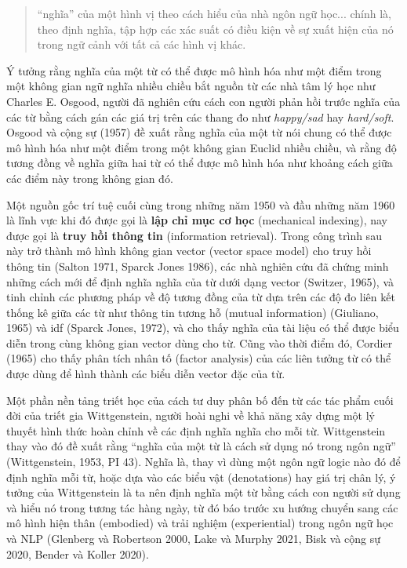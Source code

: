 \begin{quote}
``nghĩa'' của một hình vị theo cách hiểu của nhà ngôn ngữ học... chính là, theo định nghĩa, tập hợp các xác suất có điều kiện về sự xuất hiện của nó trong ngữ cảnh với tất cả các hình vị khác.
\end{quote}

Ý tưởng rằng nghĩa của một từ có thể được mô hình hóa như một điểm trong một không gian ngữ nghĩa nhiều chiều bắt nguồn từ các nhà tâm lý học như Charles E. Osgood, người đã nghiên cứu cách con người phản hồi trước nghĩa của các từ bằng cách gán các giá trị trên các thang đo như \emph{happy/sad} hay \emph{hard/soft}. Osgood và cộng sự (1957) đề xuất rằng nghĩa của một từ nói chung có thể được mô hình hóa như một điểm trong một không gian Euclid nhiều chiều, và rằng độ tương đồng về nghĩa giữa hai từ có thể được mô hình hóa như khoảng cách giữa các điểm này trong không gian đó.

Một nguồn gốc trí tuệ cuối cùng trong những năm 1950 và đầu những năm 1960 là lĩnh vực khi đó được gọi là \textbf{lập chỉ mục cơ học} (mechanical indexing), nay được gọi là \textbf{truy hồi thông tin} (information retrieval). Trong công trình sau này trở thành mô hình không gian vector (vector space model) cho truy hồi thông tin (Salton 1971, Sparck Jones 1986), các nhà nghiên cứu đã chứng minh những cách mới để định nghĩa nghĩa của từ dưới dạng vector (Switzer, 1965), và tinh chỉnh các phương pháp về độ tương đồng của từ dựa trên các độ đo liên kết thống kê giữa các từ như thông tin tương hỗ (mutual information) (Giuliano, 1965) và idf (Sparck Jones, 1972), và cho thấy nghĩa của tài liệu có thể được biểu diễn trong cùng không gian vector dùng cho từ. Cũng vào thời điểm đó, Cordier (1965) cho thấy phân tích nhân tố (factor analysis) của các liên tưởng từ có thể được dùng để hình thành các biểu diễn vector đặc của từ.

Một phần nền tảng triết học của cách tư duy phân bố đến từ các tác phẩm cuối đời của triết gia Wittgenstein, người hoài nghi về khả năng xây dựng một lý thuyết hình thức hoàn chỉnh về các định nghĩa nghĩa cho mỗi từ. Wittgenstein thay vào đó đề xuất rằng ``nghĩa của một từ là cách sử dụng nó trong ngôn ngữ'' (Wittgenstein, 1953, PI 43). Nghĩa là, thay vì dùng một ngôn ngữ logic nào đó để định nghĩa mỗi từ, hoặc dựa vào các biểu vật (denotations) hay giá trị chân lý, ý tưởng của Wittgenstein là ta nên định nghĩa một từ bằng cách con người sử dụng và hiểu nó trong tương tác hàng ngày, từ đó báo trước xu hướng chuyển sang các mô hình hiện thân (embodied) và trải nghiệm (experiential) trong ngôn ngữ học và NLP (Glenberg và Robertson 2000, Lake và Murphy 2021, Bisk và cộng sự 2020, Bender và Koller 2020).

